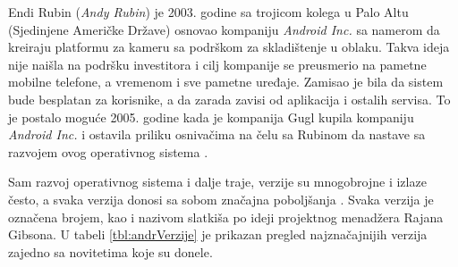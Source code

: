 \documentclass[android.tex]{subfiles}
\begin{document}
Endi Rubin (\textit{Andy Rubin}) je 2003. godine sa trojicom kolega u Palo Altu (Sjedinjene Američke Države) osnovao kompaniju \textit{Android Inc. }sa namerom da kreiraju platformu za kameru sa podrškom za skladištenje u oblaku. Takva ideja nije naišla na podršku investitora i cilj kompanije se preusmerio na  pametne mobilne telefone, a vremenom i sve pametne uređaje. Zamisao je bila da sistem bude besplatan za korisnike, a da zarada zavisi od aplikacija i ostalih servisa. To je postalo moguće 2005. godine kada je kompanija Gugl kupila kompaniju \textit{Android Inc.} i ostavila priliku osnivačima na čelu sa Rubinom da nastave sa razvojem ovog operativnog sistema \cite{book:krajci}. 

Sam razvoj operativnog sistema i dalje traje, verzije su mnogobrojne i izlaze često, a svaka verzija donosi sa sobom značajna poboljšanja
 \cite{sajt:androidDevelopers,book:mzivkovic}.  Svaka verzija je označena brojem, kao i nazivom slatkiša po ideji projektnog menadžera Rajana Gibsona. U tabeli \ref{tbl:andrVerzije} je prikazan pregled najznačajnijih verzija zajedno sa novitetima koje su donele. 
\end{document}
